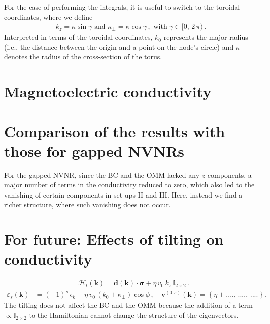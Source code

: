 \documentclass[aps,prb,onecolumn, footinbib, 10pt]{revtex4-2}
\newcommand{\bs}[1]{\boldsymbol{#1}}
\begin{document}
For the ease of performing the integrals, it is useful to switch to the toroidal coordinates, where we define
\begin{align}
\label{eqtorus}
k_z = \kappa \sin \gamma \text{ and } \kappa_\perp = \kappa \cos \gamma\,, \text{ with } \gamma \in [0, \, 2\,\pi)\,.
\end{align}
Interpreted in terms of the toroidal coordinates, $k_0$ represents the major radius (i.e., the distance between the origin and a point on the node's circle) and $\kappa $ denotes the radius of the cross-section of the torus. 

\section{Magnetoelectric conductivity}
\label{secsigma}



\section{Comparison of the results with those for gapped NVNRs}
\label{seccompare}

For the gapped NVNR, since the BC and the OMM lacked any $z$-components, a major number of terms in the conductivity reduced to zero, which also led to the vanishing of certain components in set-ups II and III. Here, instead we find a richer structure, where such vanishing does not occur.


\section{For future: Effects of tilting on conductivity}
\label{sectilt}



\begin{align}
\label{eqhamtilt}
& \mathcal{H}_t (\bs k) = {\bs d} ( \bs k) \cdot \boldsymbol{\sigma} + \eta \,v_0\, k_x\,\mathbb{I}_{2 \times 2}\,.
\end{align}
\begin{align}
\label{eqevt}
\varepsilon_s  ({ \bs k}) &= (-1)^s\, \epsilon_k + \eta \,v_0\, (k_0+\kappa_\perp) \cos \phi \,,
\quad {\boldsymbol v}^{(0,s)} ( \bs{k})  = \left\lbrace \eta + ...., \, ....,\,....\right\rbrace.
\end{align}
The tilting does not affect the BC and the OMM because the addition of a term $\propto \mathbb{I}_{2 \times 2}$ to the Hamiltonian cannot change the structure of the eigenvectors.
\end{document}
